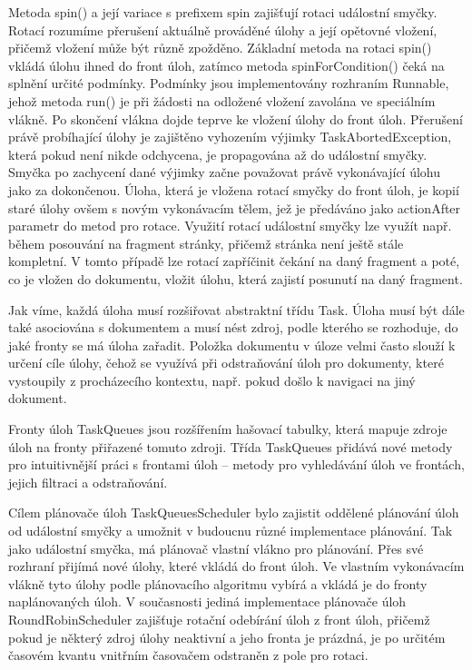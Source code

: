 Metoda spin() a její variace s prefixem spin zajišťují rotaci událostní smyčky. Rotací rozumíme přerušení aktuálně prováděné úlohy a její opětovné vložení, přičemž vložení může být různě zpožděno. Základní metoda na rotaci spin() vkládá úlohu ihned do front úloh, zatímco metoda spinForCondition() čeká na splnění určité podmínky. Podmínky jsou implementovány rozhraním Runnable, jehož metoda run() je při žádosti na odložené vložení zavolána ve speciálním vlákně. Po skončení vlákna dojde teprve ke vložení úlohy do front úloh. Přerušení právě probíhající úlohy je zajištěno vyhozením výjimky TaskAbortedException, která pokud není nikde odchycena, je propagována až do událostní smyčky. Smyčka po zachycení dané výjimky začne považovat právě vykonávající úlohu jako za dokončenou. Úloha, která je vložena rotací smyčky do front úloh, je kopií staré úlohy ovšem s novým vykonávacím tělem, jež je předáváno jako actionAfter parametr do metod pro rotace. Využití rotací událostní smyčky lze využít např. během posouvání na fragment stránky, přičemž stránka není ještě stále kompletní. V tomto případě lze rotací zapříčinit čekání na daný fragment a poté, co je vložen do dokumentu, vložit úlohu, která zajistí posunutí na daný fragment.

Jak víme, každá úloha musí rozšiřovat abstraktní třídu Task. Úloha musí být dále také asociována s dokumentem a musí nést zdroj, podle kterého se rozhoduje, do jaké fronty se má úloha zařadit. Položka dokumentu v úloze velmi často slouží k určení cíle úlohy, čehož se využívá při odstraňování úloh pro dokumenty, které vystoupily z procházecího kontextu, např. pokud došlo k navigaci na jiný dokument. 

Fronty úloh TaskQueues jsou rozšířením hašovací tabulky, která mapuje zdroje úloh na fronty přiřazené tomuto zdroji. Třída TaskQueues přidává nové metody pro intuitivnější práci s frontami úloh – metody pro vyhledávání úloh ve frontách, jejich filtraci a odstraňování.

Cílem plánovače úloh TaskQueuesScheduler bylo zajistit oddělené plánování úloh od událostní smyčky a umožnit v budoucnu různé implementace plánování. Tak jako událostní smyčka, má plánovač vlastní vlákno pro plánování. Přes své rozhraní přijímá nové úlohy, které vkládá do front úloh. Ve vlastním vykonávacím vlákně tyto úlohy podle plánovacího algoritmu vybírá a vkládá je do fronty naplánovaných úloh. V současnosti jediná implementace plánovače úloh RoundRobinScheduler zajišťuje rotační odebírání úloh z front úloh, přičemž pokud je některý zdroj úlohy neaktivní a jeho fronta je prázdná, je po určitém časovém kvantu vnitřním časovačem odstraněn z pole pro rotaci.

